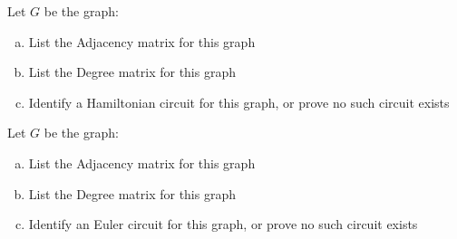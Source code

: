 \documentclass[10pt,letterpaper, cm]{hmcpset}
\begin{document}
\begin{problem}[9]
    Let $G$ be the graph:
    \begin{center}
    \end{center}

    \begin{enumerate}[(a)]
        \item List the Adjacency matrix for this graph
        \item List the Degree matrix for this graph
        \item Identify a Hamiltonian circuit for this graph, or prove no such circuit exists
    \end{enumerate}
\end{problem}

\begin{problem}[10]
    Let $G$ be the graph:
    \begin{center}
    \end{center}

    \begin{enumerate}[(a)]
        \item List the Adjacency matrix for this graph
        \item List the Degree matrix for this graph
        \item Identify an Euler circuit for this graph, or prove no such circuit exists
    \end{enumerate}
\end{problem}
\end{document}
